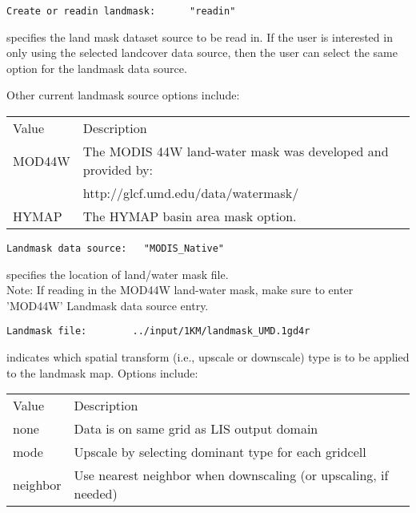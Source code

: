  \begin{Verbatim}[frame=single]
Create or readin landmask:      "readin"
 \end{Verbatim}

 
  specifies the land mask
 dataset source to be read in.  If the user is interested in
 only using the selected landcover data source, then the user 
 can select the same option for the landmask data source.
  
 Other current landmask source options include:

 \begin{tabular}{ll}
 Value     & Description                                           \\
 MOD44W    & The MODIS 44W land-water mask was developed and provided by: \\
           &  http://glcf.umd.edu/data/watermask/ \\
 HYMAP     & The HYMAP basin area mask option. \\
 \end{tabular}
 

 \begin{Verbatim}[frame=single]
Landmask data source:   "MODIS_Native"
 \end{Verbatim}

 
  specifies the location of land/water mask file. \\
 Note: If reading in the MOD44W land-water mask, make sure to enter   
 'MOD44W' Landmask data source entry.
 

 \begin{Verbatim}[frame=single]
Landmask file:        ../input/1KM/landmask_UMD.1gd4r
 \end{Verbatim}

 
  indicates which spatial transform
 (i.e., upscale or downscale) type is to be applied to the landmask
 map.  Options include:

 \begin{tabular}{ll}
 Value     & Description                                           \\
 none      &  Data is on same grid as LIS output domain            \\
 mode      &  Upscale by selecting dominant type for each gridcell \\
 neighbor  &  Use nearest neighbor when downscaling (or upscaling, if needed) \\
 \end{tabular}
 

